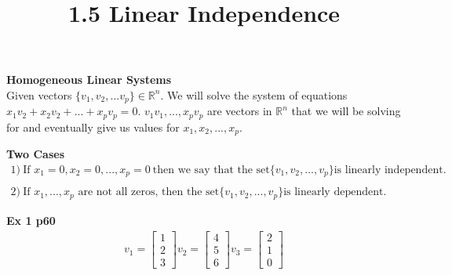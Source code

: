 \documentclass{article}
\title{1.5 Linear Independence}
\begin{document}
  \maketitle
  \textbf{Homogeneous Linear Systems}\\
  Given vectors $ \{v_{1},v_{2},...v_{p}\} \in \mathbb{R}^{n} $. We will solve the system of equations $ x_{1}v_{2}+x_{2}v_{2}+...+x_{p}v_{p}=0$. $ v_{1}v_{1}, ..., x_{p}v_{p}$ are vectors in $\mathbb{R}^{n}$ that we will be solving for and eventually give us values for $ x_{1},x_{2},...,x_{p}$.

  \textbf{Two Cases}
  \[
    \begin{gathered}
      1)~\text{If } x_{1}=0, x_{2}=0,...,x_{p}=0~\text{then we say that the set} \{v_{1},v_{2},...,v_{p}\} \text{is linearly independent.} \\
      ~\\
      2)~\text{If } x_{1},...,x_{p} \text{ are not all zeros, then the set} \{v_{1},v_{2},...,v_{p}\} \text{is linearly dependent.} 
    \end{gathered}
  \]

  \textbf{Ex 1 p60}
  \[
    \begin{gathered}
    v_{1}= \begin{bmatrix}
      1\\
      2\\
      3
    \end{bmatrix}
    v_{2} = \begin{bmatrix}
      4\\
      5\\
      6
    \end{bmatrix}
    v_{3}=\begin{bmatrix}
      2\\
      1\\
      0
    \end{bmatrix} \\
    \end{gathered}
  \]
  
\end{document}

